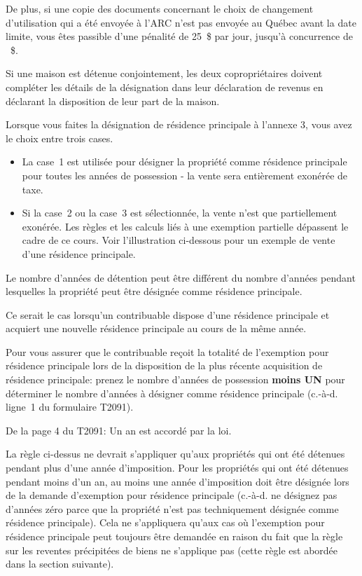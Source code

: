 De plus, si une copie des documents concernant le choix de changement d'utilisation qui a été envoyée à l'ARC n'est pas envoyée au Québec avant la date limite, vous êtes passible d'une pénalité de 25~\$ par jour, jusqu'à concurrence de ~\$.

Si une maison est détenue conjointement, les deux copropriétaires doivent compléter les détails de la désignation dans leur déclaration de revenus en déclarant la disposition de leur part de la maison.

Lorsque vous faites la désignation de résidence principale à l'annexe 3, vous avez le choix entre trois cases.
\begin{itemize}
	\item La case~1 est utilisée pour désigner la propriété comme résidence principale pour toutes les années de possession - la vente sera entièrement exonérée de taxe.
	\item Si la case~2 ou la case~3 est sélectionnée, la vente n'est que partiellement exonérée. Les règles et les calculs liés à une exemption partielle dépassent le cadre de ce cours. Voir l'illustration ci-dessous pour un exemple de vente d'une résidence principale.
\end{itemize}

\begin{note}
	Le nombre d'années de détention peut être différent du nombre d'années pendant lesquelles la propriété peut être désignée comme résidence principale.
	
	Ce serait le cas lorsqu'un contribuable dispose d'une résidence principale et acquiert une nouvelle résidence principale au cours de la même année.
	
	Pour vous assurer que le contribuable reçoit la totalité de l'exemption pour résidence principale lors de la disposition de la plus récente acquisition de résidence principale: prenez le nombre d'années de possession \textbf{moins UN} pour déterminer le nombre d'années à désigner comme résidence principale (c.-à-d. ligne~1 du formulaire T2091).
	
	De la page 4 du T2091: Un an est accordé par la loi.
	
	La règle ci-dessus ne devrait s'appliquer qu'aux propriétés qui ont été détenues pendant plus d'une année d'imposition. Pour les propriétés qui ont été détenues pendant moins d'un an, au moins une année d'imposition doit être désignée lors de la demande d'exemption pour résidence principale (c.-à-d. ne désignez pas d'années \og zéro \fg{} parce que la propriété n'est pas techniquement désignée comme résidence principale). Cela ne s'appliquera qu'aux cas où l'exemption pour résidence principale peut toujours être demandée en raison du fait que la règle sur les reventes précipitées de biens ne s'applique pas (cette règle est abordée dans la section suivante). 
\end{note}



